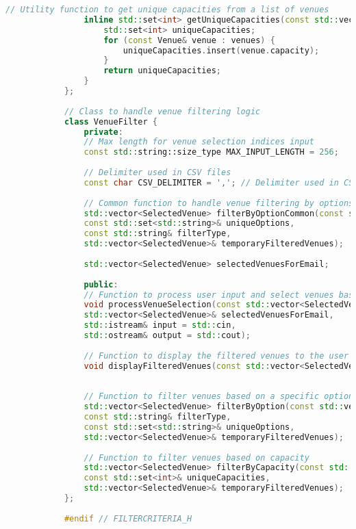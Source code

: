 \documentclass{article}
\begin{document}
\begin{mdframed}[backgroundcolor=background, hidealllines=false, innerleftmargin=15pt, innerrightmargin=5pt, innertopmargin=0pt, innerbottommargin=-5pt, linecolor=accent]
\begin{lstlisting}[language=C++]
				// Utility function to get unique capacities from a list of venues
				inline std::set<int> getUniqueCapacities(const std::vector<Venue>& venues) {
					std::set<int> uniqueCapacities;
					for (const Venue& venue : venues) {
						uniqueCapacities.insert(venue.capacity);
					}
					return uniqueCapacities;
				}
			};
			
			// Class to handle venue filtering logic
			class VenueFilter {
				private:
				// Max length for venue selection indices input
				const std::string::size_type MAX_INPUT_LENGTH = 256;
				
				// Delimiter used in CSV files
				const char CSV_DELIMITER = ','; // Delimiter used in CSV files
				
				// Common function to handle venue filtering by options like Genre, State, City
				std::vector<SelectedVenue> filterByOptionCommon(const std::vector<Venue>& venues,
				const std::set<std::string>& uniqueOptions,
				const std::string& filterType,
				std::vector<SelectedVenue>& temporaryFilteredVenues);
				
				std::vector<SelectedVenue> selectedVenuesForEmail;
				
				public:
				// Function to process user input and select venues based on it
				void processVenueSelection(const std::vector<SelectedVenue>& temporaryFilteredVenues,
				std::vector<SelectedVenue>& selectedVenuesForEmail,
				std::istream& input = std::cin,
				std::ostream& output = std::cout);
				
				// Function to display the filtered venues to the user
				void displayFilteredVenues(const std::vector<SelectedVenue>& selectedVenuesForDisplay);
				
				
				// Function to filter venues based on a specific option (Genre, State, etc.)
				std::vector<SelectedVenue> filterByOption(const std::vector<Venue>& venues,
				const std::string& filterType,
				const std::set<std::string>& uniqueOptions,
				std::vector<SelectedVenue>& temporaryFilteredVenues);
				
				// Function to filter venues based on capacity
				std::vector<SelectedVenue> filterByCapacity(const std::vector<Venue>& venues,
				const std::set<int>& uniqueCapacities,
				std::vector<SelectedVenue>& temporaryFilteredVenues);
			};
			
			#endif // FILTERCRITERIA_H
		\end{lstlisting}
	\end{mdframed}
	
\end{document}
